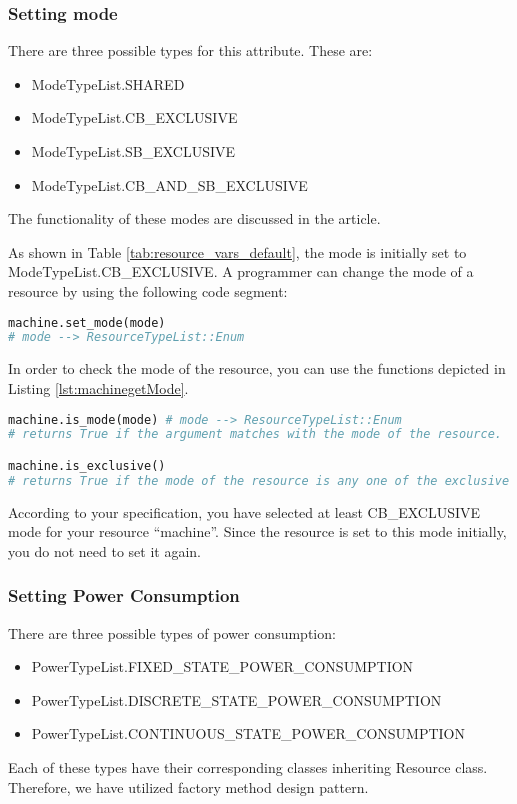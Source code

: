 \documentclass[]{scrartcl}
\begin{document}
\subsubsection{Setting mode}
There are three possible types for this attribute. These are:
\begin{itemize}
    \item \textsf{ModeTypeList.SHARED}
    \item \textsf{ModeTypeList.CB\_EXCLUSIVE}
    \item \textsf{ModeTypeList.SB\_EXCLUSIVE}
    \item \textsf{ModeTypeList.CB\_AND\_SB\_EXCLUSIVE}
\end{itemize}
The functionality of these modes are discussed in the article.

As shown in Table \ref{tab:resource_vars_default}, the mode is initially set to \textsf{ModeTypeList.CB\_EXCLUSIVE}. A programmer can change the mode of a resource by using the following code segment:

\begin{lstlisting}[language=Python, frame=single, label={lst:machinesetMode}, caption={Setting the mode of a resource after creating a resource.}]
machine.set_mode(mode)
# mode --> ResourceTypeList::Enum
\end{lstlisting}
        

In order to check the mode of the resource, you can use the functions depicted in Listing \ref{lst:machinegetMode}.

\begin{lstlisting}[language=Python, frame=single, label={lst:machinegetMode}, caption={The functions for resource mode check.}]
machine.is_mode(mode) # mode --> ResourceTypeList::Enum
# returns True if the argument matches with the mode of the resource.

machine.is_exclusive()
# returns True if the mode of the resource is any one of the exclusive mode.
\end{lstlisting}
        
        
According to your specification, you have selected at least \textsf{CB\_EXCLUSIVE} mode for your resource ``machine''. Since the resource is set to this mode initially, you do not need to set it again.
        
\subsubsection{Setting Power Consumption}
There are three possible types of power consumption:
\begin{itemize}
    \item \textsf{PowerTypeList.FIXED\_STATE\_POWER\_CONSUMPTION}
    \item \textsf{PowerTypeList.DISCRETE\_STATE\_POWER\_CONSUMPTION}
    \item \textsf{PowerTypeList.CONTINUOUS\_STATE\_POWER\_CONSUMPTION}
\end{itemize}
Each of these types have their corresponding classes inheriting \textsf{Resource} class. Therefore, we have utilized factory method design pattern.
        
\end{document}
